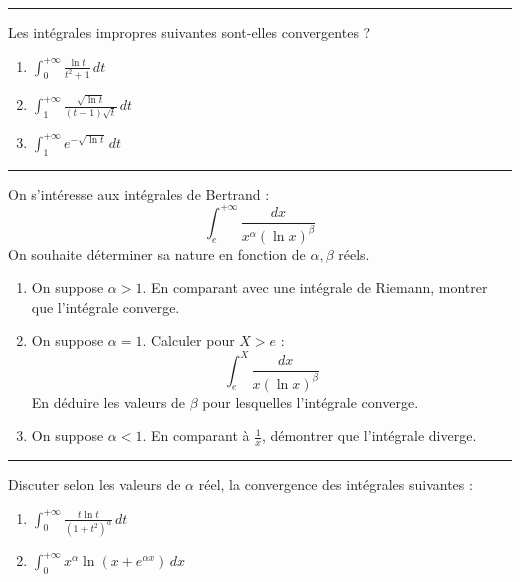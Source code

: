 \documentclass[../PolyS4.tex]{subfiles}
\begin{document}
\vspace{1em}
\hrule
\vspace{1em}


Les intégrales impropres suivantes sont-elles convergentes ?

\begin{enumerate}
\item $\displaystyle\int_{0}^{+\infty} \frac{\ln t}{t^{2}+1} \, dt$
\item $\displaystyle\int_{1}^{+\infty} \frac{\sqrt{\ln t}}{(t-1) \sqrt{t}} \, dt$
\item $\displaystyle\int_{1}^{+\infty} e^{-\sqrt{\ln t}} \, dt$
\end{enumerate}

\vspace{1em}
\hrule
\vspace{1em}

\newpage


On s'intéresse aux intégrales de Bertrand :
$$\int_{e}^{+\infty} \frac{dx}{x^{\alpha}(\ln x)^{\beta}}$$
On souhaite déterminer sa nature en fonction de $\alpha, \beta$ réels.

\begin{enumerate}
\item On suppose $\alpha > 1$. En comparant avec une intégrale de Riemann, montrer que l'intégrale converge.
\item On suppose $\alpha = 1$. Calculer pour $X > e$ :
$$\int_{e}^{X} \frac{dx}{x(\ln x)^{\beta}}$$
En déduire les valeurs de $\beta$ pour lesquelles l'intégrale converge.
\item On suppose $\alpha < 1$. En comparant à $\frac{1}{x}$, démontrer que l'intégrale diverge.
\end{enumerate}

\vspace{1em}
\hrule
\vspace{1em}


Discuter selon les valeurs de $\alpha$ réel, la convergence des intégrales suivantes :

\begin{enumerate}
\item $\displaystyle\int_{0}^{+\infty} \frac{t \ln t}{(1+t^{2})^{\alpha}} \, dt$
\item $\displaystyle\int_{0}^{+\infty} x^{\alpha} \ln \left(x+e^{\alpha x}\right) \, dx$
\end{enumerate}
\end{document}
